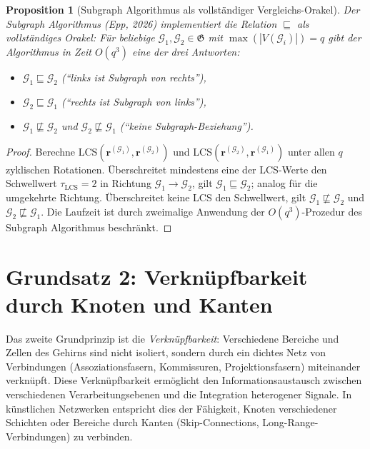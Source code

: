 \documentclass[12pt, a4paper, openany]{report}
\newtheorem{proposition}[theorem]{Proposition}
\newcommand{\calG}{\mathcal{G}}
\begin{document}
\begin{proposition}[Subgraph Algorithmus als vollständiger Vergleichs-Orakel]
\label{prop:subgraph_oracle}
Der Subgraph Algorithmus (Epp, 2026) implementiert die Relation
$\sqsubseteq$ als vollständiges Orakel: Für beliebige
$\calG_1, \calG_2 \in \mathfrak{G}$ mit $\max(|V(\calG_i)|) = q$ gibt der
Algorithmus in Zeit $O(q^3)$ eine der drei Antworten:
\begin{itemize}
  \item $\calG_1 \sqsubseteq \calG_2$ (``links ist Subgraph von rechts''),
  \item $\calG_2 \sqsubseteq \calG_1$ (``rechts ist Subgraph von links''),
  \item $\calG_1 \not\sqsubseteq \calG_2$ und $\calG_2 \not\sqsubseteq \calG_1$ (``keine Subgraph-Beziehung'').
\end{itemize}
\end{proposition}

\begin{proof}
Berechne LCS$(\bm{r}^{(\calG_1)}, \bm{r}^{(\calG_2)})$ und
LCS$(\bm{r}^{(\calG_2)}, \bm{r}^{(\calG_1)})$ unter allen $q$ zyklischen
Rotationen.  Überschreitet mindestens eine der LCS-Werte den Schwellwert
$\tau_{\mathrm{LCS}} = 2$ in Richtung $\calG_1 \to \calG_2$, gilt
$\calG_1 \sqsubseteq \calG_2$; analog für die umgekehrte Richtung.
Überschreitet keine LCS den Schwellwert, gilt
$\calG_1 \not\sqsubseteq \calG_2$ und $\calG_2 \not\sqsubseteq \calG_1$.  Die Laufzeit ist durch zweimalige
Anwendung der $O(q^3)$-Prozedur des Subgraph Algorithmus beschränkt.
\end{proof}

\section{Grundsatz 2: Verknüpfbarkeit durch Knoten und Kanten}
\label{sec:bio_linkability}

Das zweite Grundprinzip ist die \emph{Verknüpfbarkeit}: Verschiedene
Bereiche und Zellen des Gehirns sind nicht isoliert, sondern durch
ein dichtes Netz von Verbindungen (Assoziationsfasern, Kommissuren,
Projektionsfasern) miteinander verknüpft.  Diese Verknüpfbarkeit ermöglicht
den Informationsaustausch zwischen verschiedenen Verarbeitungsebenen und
die Integration heterogener Signale.  In künstlichen Netzwerken entspricht
dies der Fähigkeit, Knoten verschiedener Schichten oder Bereiche durch
Kanten (Skip-Connections, Long-Range-Verbindungen) zu verbinden.
\end{document}
